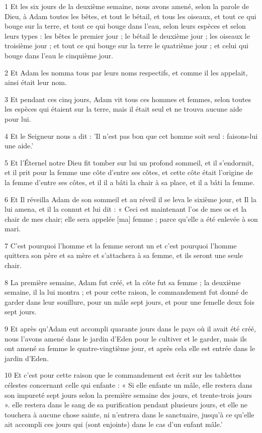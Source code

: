 \par 1 Et les six jours de la deuxième semaine, nous avons amené, selon la parole de Dieu, à Adam toutes les bêtes, et tout le bétail, et tous les oiseaux, et tout ce qui bouge sur la terre, et tout ce qui bouge dans l'eau, selon leurs espèces et selon leurs types : les bêtes le premier jour ; le bétail le deuxième jour ; les oiseaux le troisième jour ; et tout ce qui bouge sur la terre le quatrième jour ; et celui qui bouge dans l'eau le cinquième jour.
\par 2 Et Adam les nomma tous par leurs noms respectifs, et comme il les appelait, ainsi était leur nom.
\par 3 Et pendant ces cinq jours, Adam vit tous ces hommes et femmes, selon toutes les espèces qui étaient sur la terre, mais il était seul et ne trouva aucune aide pour lui.
\par 4 Et le Seigneur nous a dit : 'Il n'est pas bon que cet homme soit seul : faisons-lui une aide.'
\par 5 Et l'Éternel notre Dieu fit tomber sur lui un profond sommeil, et il s'endormit, et il prit pour la femme une côte d'entre ses côtes, et cette côte était l'origine de la femme d'entre ses côtes, et il il a bâti la chair à sa place, et il a bâti la femme.
\par 6 Et Il réveilla Adam de son sommeil et au réveil il se leva le sixième jour, et Il la lui amena, et il la connut et lui dit : « Ceci est maintenant l'os de mes os et la chair de mes chair; elle sera appelée [ma] femme ; parce qu'elle a été enlevée à son mari.
\par 7 C'est pourquoi l'homme et la femme seront un et c'est pourquoi l'homme quittera son père et sa mère et s'attachera à sa femme, et ils seront une seule chair.
\par 8 La première semaine, Adam fut créé, et la côte fut sa femme ; la deuxième semaine, il la lui montra ; et pour cette raison, le commandement fut donné de garder dans leur souillure, pour un mâle sept jours, et pour une femelle deux fois sept jours.
\par 9 Et après qu'Adam eut accompli quarante jours dans le pays où il avait été créé, nous l'avons amené dans le jardin d'Eden pour le cultiver et le garder, mais ils ont amené sa femme le quatre-vingtième jour, et après cela elle est entrée dans le jardin d'Eden.
\par 10 Et c'est pour cette raison que le commandement est écrit sur les tablettes célestes concernant celle qui enfante : « Si elle enfante un mâle, elle restera dans son impureté sept jours selon la première semaine des jours, et trente-trois jours ». elle restera dans le sang de sa purification pendant plusieurs jours, et elle ne touchera à aucune chose sainte, ni n'entrera dans le sanctuaire, jusqu'à ce qu'elle ait accompli ces jours qui (sont enjoints) dans le cas d'un enfant mâle.'
